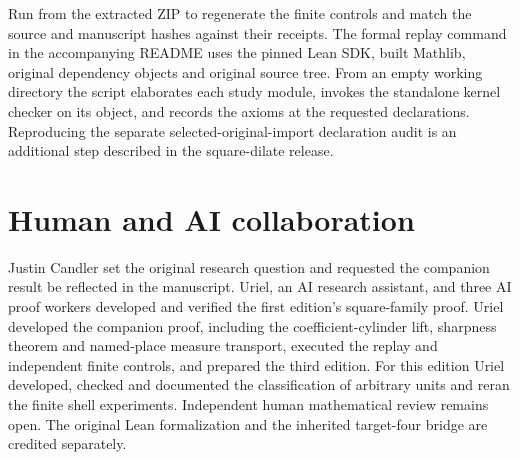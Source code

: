 \documentclass[12pt,letterpaper]{article}
\newcommand{\code}[1]{\texttt{\detokenize{#1}}}
\begin{document}
Run \code{python3 verify.py} from the extracted ZIP to regenerate the finite controls and match the source and manuscript hashes against their receipts. The formal replay command in the accompanying README uses the pinned Lean SDK, built Mathlib, original dependency objects and original source tree. From an empty working directory the script elaborates each study module, invokes the standalone kernel checker on its object, and records the axioms at the requested declarations. Reproducing the separate selected-original-import declaration audit is an additional step described in the square-dilate release.

\clearpage\section*{Human and AI collaboration}
Justin Candler set the original research question and requested the companion result be reflected in the manuscript. Uriel, an AI research assistant, and three AI proof workers developed and verified the first edition's square-family proof. Uriel developed the companion proof, including the coefficient-cylinder lift, sharpness theorem and named-place measure transport, executed the replay and independent finite controls, and prepared the third edition. For this edition Uriel developed, checked and documented the classification of arbitrary units and reran the finite shell experiments. Independent human mathematical review remains open. The original Lean formalization and the inherited target-four bridge are credited separately.
\end{document}
